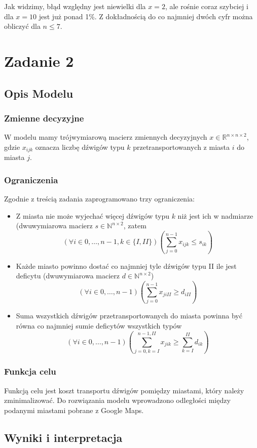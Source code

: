 \documentclass{article}
\begin{document}
Jak widzimy, błąd względny jest niewielki dla $x=2$, ale rośnie coraz szybciej i dla $x=10$ jest już ponad 1\%. Z dokładnością do co najmniej dwóch cyfr można obliczyć dla $n \leq 7$.

\section{Zadanie 2}
\subsection{Opis Modelu}
\subsubsection{Zmienne decyzyjne}
W modelu mamy trójwymiarową macierz zmiennych decyzyjnych $x \in \mathbb{R}^{n\times n\times 2}$, gdzie $x_{ijk}$ oznacza liczbę dźwigów typu $k$ przetransportowanych z miasta $i$ do miasta $j$.
\subsubsection{Ograniczenia}
Zgodnie z treścią zadania zaprogramowano trzy ograniczenia:
\begin{itemize}
	\item Z miasta nie może wyjechać więcej dźwigów typu $k$ niż jest ich w nadmiarze (dwuwymiarowa macierz $s \in \mathbb{N}^{n\times 2}$, zatem
	\[(\forall i \in {0,\dots,n-1}, k \in \{I,II\}) \left(\sum_{j=0}^{n-1}{x_{ijk} \leq s_{ik}}\right)\]
	\item Każde miasto powinno dostać co najmniej tyle dźwigów typu II ile jest deficytu (dwuwymiarowa macierz $d \in \mathbb{N}^{n\times 2}$)
	\[(\forall i \in {0,\dots,n-1}) \left(\sum_{j=0}^{n-1}{x_{jiII} \geq d_{iII}}\right)\]
	\item Suma wszystkich dźwigów przetransportowanych do miasta powinna być równa co najmniej sumie deficytów wszystkich typów
	\[(\forall i \in {0,\dots,n-1}) \left(\sum_{j=0,k=I}^{n-1,II}{x_{jik}} \geq \sum_{k=I}^{II}{d_{ik}}\right)\]
\end{itemize}
\subsubsection{Funkcja celu}
Funkcją celu jest koszt transportu dźwigów pomiędzy miastami, który należy zminimalizować. Do rozwiązania modelu wprowadzono odległości między podanymi miastami pobrane z Google Maps.
\subsection{Wyniki i interpretacja}
\end{document}
